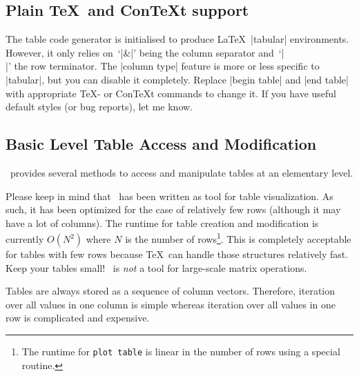 

\subsection{Plain \TeX\ and Con\TeX t support}
\label{sec:pgfplotstable:context}
The table code generator is initialised to produce \LaTeX\ |tabular| environments. However, it only relies on~`|&|' being the column separator and~`|\\|' the row terminator. The |column type| feature is more or less specific to |tabular|, but you can disable it completely. Replace |begin table| and |end table| with appropriate \TeX- or Con\TeX t commands to change it. If you have useful default styles (or bug reports), let me know.

\subsection{Basic Level Table Access and Modification}
\PGFPlotstable\ provides several methods to access and manipulate tables at an elementary level.

Please keep in mind that \PGFPlotstable\ has been written as tool for table visualization. As such, it has been optimized for the case of relatively few rows (although it may have a lot of columns). The runtime for table creation and modification is currently $O(N^2)$ where $N$ is the number of rows\footnote{The runtime for \texttt{plot table} is linear in the number of rows using a special routine.}. This is completely acceptable for tables with few rows because \TeX\ can handle those structures relatively fast. Keep your tables small! \PGFPlotstable\ is \emph{not} a tool for large-scale matrix operations.

Tables are always stored as a sequence of column vectors. Therefore, iteration over all values in one column is simple whereas iteration over all values in one row is complicated and expensive.

